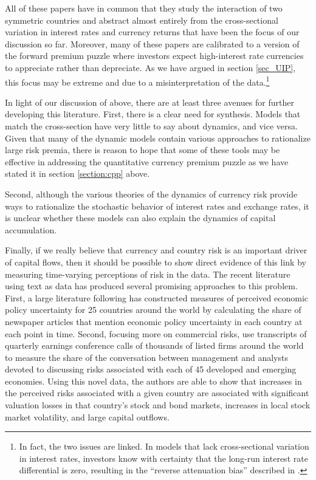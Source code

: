 \documentclass{ar-1col}
\begin{document}
All of these papers have in common that they study the interaction of two symmetric countries and abstract almost entirely from the cross-sectional variation in interest rates and currency returns that have been the focus of our discussion so far. Moreover, many of these papers are calibrated to a version of the forward premium puzzle where investors expect high-interest rate currencies to appreciate rather than depreciate. As we have argued in section \ref{sec_UIP}, this focus may be extreme and due to a misinterpretation of the data.\footnote{In fact, the two issues are linked. In models that lack cross-sectional variation in interest rates, investors know with certainty that the long-run interest rate differential is zero, resulting in the ``reverse attenuation bias'' described in \cite{HassanMano2019}.} 

In light of our discussion of above, there are at least three avenues for further developing this literature. First, there is a clear need for synthesis. Models that match the cross-section have very little to say about dynamics, and vice versa. Given that many of the dynamic models contain various approaches to rationalize large risk premia, there is reason to hope that some of these tools may be effective in addressing the quantitative currency premium puzzle as we have stated it in section \ref{section:cpp} above. 

Second, although the various theories of the dynamics of currency risk provide ways to rationalize the stochastic behavior of interest rates and exchange rates, it is unclear whether these models can also explain the dynamics of capital accumulation. 


Finally, if we really believe that currency and country risk is an important driver of capital flows, then it should be possible to show direct evidence of this link by measuring time-varying perceptions of risk in the data. The recent literature using text as data has produced several promising approaches to this problem. First, a large literature following \cite{baker2016measuring} has constructed measures of perceived economic policy uncertainty for 25 countries around the world by calculating the share of newspaper articles that mention economic policy uncertainty in each country at each point in time. Second, focusing more on commercial risks, \cite{hassan2020country} use transcripts of quarterly earnings conference calls of thousands of listed firms around the world to measure the share of the conversation between management and analysts devoted to discussing risks associated with each of 45 developed and emerging economies. Using this novel data, the authors are able to show that increases in the perceived risks associated with a given country are associated with significant valuation losses in that country's stock and bond markets, increases in local stock market volatility, and large capital outflows. 
\end{document}
